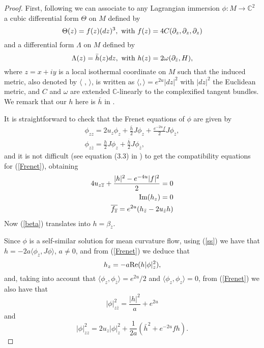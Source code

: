 \documentclass[leqno,11pt]{amsart}
\begin{document}
\begin{proof}
First, following \cite{CU1} we can associate to any Lagrangian
immersion $\phi :M \longrightarrow {\mathbb{C}} ^2$ a cubic differential
form $\Theta $ on $M$ defined by
\[ \Theta (z)=f(z)(dz)^3, {\rm \ with \ } f(z)=4C(\partial_{z},\partial_{z},
  \partial_{z}) \]
and a differential form $\Lambda $ on $M$ defined by
\[ \Lambda (z)=\bar{h}(z)dz, {\rm \ with \ } h(z)=2 \omega (
\partial_{\bar z}, H ), \]
where $ z=x+iy$ is a local isothermal coordinate on $M$ such that
the induced metric, also denoted by $\langle \,\, , \, \rangle $,
is written as $\langle ,\rangle = e^{2u}|dz|^2$ with $|dz|^2$ the
Euclidean metric, and $C$ and $\omega $ are extended ${\mathbb{C}}$-linearly
to the complexified tangent bundles. We remark that our $h$ here
is $\bar h$ in \cite{CU1}.

It is straightforward to check that the Frenet equations of $\phi $  are given by
\begin{eqnarray}\label{Frenet}
 \phi_{zz} = 2u_{z}\phi_{z} + \frac{\bar h}{2} J\phi_{z}+
 \frac{e^{-2u} f}{2} J\phi_{\overline{z}},  \\
  \phi_{z \overline{z}} = \frac{h}{2}
              J\phi_{z}+\frac{\overline h}{2}J\phi_{\overline{z}}, \nonumber
\end{eqnarray}
and it is not difficult (see equation (3.3) in \cite{CU1}) to get
the compatibility equations for (\ref{Frenet}), obtaining
\begin{eqnarray}\label{compa}
4u_{z  \overline{z}}+\frac{|h|^2-e^{-4u}|f|^2}{2}  =  0 \nonumber \\
{\rm Im}(h_z)  =  0 \\
\overline{f_{\overline{z}}}=e^{2u}(h_{\bar z}-2u_{\bar z}h) \nonumber
\end{eqnarray}
Now (\ref{beta}) translates into $h=\beta_{\bar z}$.

Since $\phi $ is a self-similar solution for mean curvature flow,
using (\ref{ss}) we have that $h=-2a\langle \phi_{\overline z},
J\phi \rangle$, $a\neq 0$, and from (\ref{Frenet}) we deduce that
\begin{equation}\label{hz}
h_z=-a {\rm Re}(h|\phi|^2_z),
\end{equation}
and, taking into account that $\langle \phi_z , \phi_{\bar z}
\rangle=e^{2u}/2$ and $\langle \phi_z, \phi_z \rangle =0$, from
(\ref{Frenet}) we also have that
\begin{equation}\label{mod}
|\phi|^2_{z \overline{z}}=\frac{|h|^2}{a}+e^{2u}
\end{equation}
and
\begin{equation}\label{f}
|\phi|^2_{zz}= 2u_z |\phi|^2_z + \frac{1}{2a} \left( \bar{h}^2 +
e^{-2u} f h \right).
\end{equation}


\end{proof}
\end{document}
